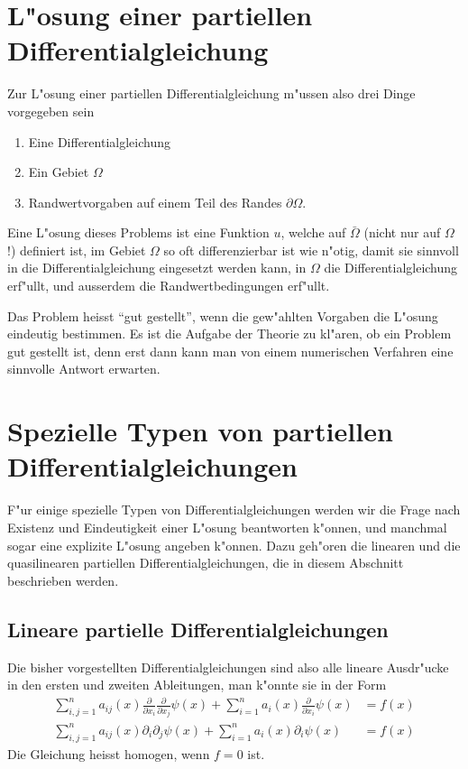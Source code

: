 \section{L"osung einer partiellen Differentialgleichung\label{klassifikation:loesung}}
Zur L"osung einer partiellen Differentialgleichung m"ussen also
drei Dinge vorgegeben sein
\begin{enumerate}
\item Eine Differentialgleichung
\item Ein Gebiet $\Omega$
\item Randwertvorgaben auf einem Teil des Randes $\partial\Omega$.
\end{enumerate}
\begin{definition}
Eine L"osung dieses Problems ist eine Funktion $u$, welche
auf $\bar\Omega$ (nicht nur auf $\Omega$!) definiert ist,
im Gebiet $\Omega$ so oft differenzierbar ist wie n"otig, damit
sie sinnvoll in die Differentialgleichung eingesetzt werden kann,
in $\Omega$ die Differentialgleichung erf"ullt,
und ausserdem die Randwertbedingungen erf"ullt.
\end{definition}

Das Problem heisst ``gut gestellt'', wenn die gew"ahlten Vorgaben
die L"osung eindeutig bestimmen.
Es ist die Aufgabe der Theorie zu kl"aren, ob ein Problem
gut gestellt ist, denn erst dann kann man von einem numerischen
Verfahren eine sinnvolle Antwort erwarten.

\section{Spezielle Typen von partiellen Differentialgleichungen\label{klassifikation:spezielletypen}}
F"ur einige spezielle Typen von Differentialgleichungen werden wir
die Frage nach Existenz und Eindeutigkeit einer L"osung beantworten
k"onnen, und manchmal sogar eine explizite L"osung angeben k"onnen.
Dazu geh"oren die linearen und die quasilinearen partiellen
Differentialgleichungen, die in diesem Abschnitt beschrieben werden.

\subsection{Lineare partielle Differentialgleichungen\label{klassifikation:linear}}
Die bisher vorgestellten Differentialgleichungen sind also alle lineare
Ausdr"ucke in den ersten und zweiten Ableitungen, man k"onnte sie in der
Form
\begin{align*}
\sum_{i,j=1}^n a_{ij}(x)\frac{\partial}{\partial x_i} \frac{\partial}{\partial x_j}\psi(x)
+\sum_{i=1}^na_i(x)\frac{\partial}{\partial x_i}\psi(x)&=f(x)
\\
\sum_{i,j=1}^n a_{ij}(x)\partial_i \partial_j\psi(x)
+\sum_{i=1}^na_i(x)\partial_i\psi(x)&=f(x)
\end{align*}
Die Gleichung heisst homogen, wenn $f=0$ ist.

